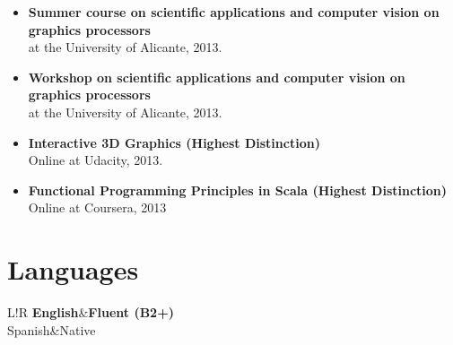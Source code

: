 \documentclass[8pt]{article}
\newcommand\VRule{\color{lightgray}\vrule width 0.5pt}
\begin{document}
\begin{itemize}
	\item \textbf{Summer course on scientific applications and computer vision on graphics processors}\\ at the University of Alicante, 2013.
	\item \textbf{Workshop on scientific applications and computer vision on graphics processors}\\ at the University of Alicante, 2013.	
	\item \textbf{Interactive 3D Graphics (Highest Distinction)}\\
	Online at Udacity, 2013.
	\item \textbf{Functional Programming Principles in Scala (Highest Distinction)}\\
	Online at Coursera, 2013
\end{itemize}

\section*{Languages}
\begin{tabular}{L!{\VRule}R}
{\bf English}&{\bf Fluent (B2+)}\\
{Spanish}&{Native}\\
\end{tabular}
\end{document}
